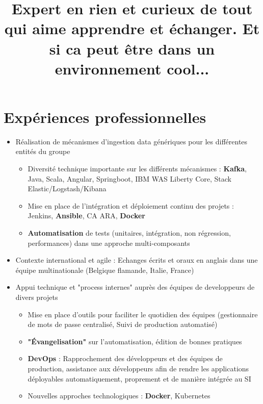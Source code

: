 \documentclass[10pt,a4paper]{moderncv}
\title{Expert en rien et curieux de tout qui aime apprendre et échanger.\newline
Et si ca peut être dans un environnement cool...}
\begin{document}
\makecvtitle

\section{Expériences professionnelles}

{
\begin{itemize}
 \item Réalisation de mécanismes d'ingestion data génériques pour les différentes entités du groupe
  \begin{itemize}
   \item Diversité technique importante sur les différents mécanismes : \textbf{Kafka}, Java, Scala, Angular, Springboot, IBM WAS Liberty Core, Stack Elastic/Logstash/Kibana
   \item Mise en place de l'intégration et déploiement continu des projets : Jenkins, \textbf{Ansible}, CA ARA, \textbf{Docker}
   \item \textbf{Automatisation} de tests (unitaires, intégration, non régression, performances) dans une approche multi-composants
  \end{itemize}
 \item Contexte international et agile : Echanges écrits et oraux en anglais dans une équipe multinationale (Belgique flamande, Italie, France) 
\end{itemize}
}

{
\begin{itemize}
 \item Appui technique et "process internes" auprès des équipes de developpeurs de divers projets
  \begin{itemize}
   \item Mise en place d'outils pour faciliter le quotidien des équipes (gestionnaire de mots de passe centralisé, Suivi de production automatisé) 
   \item \textbf{"\'{E}vangelisation"} sur l'automatisation, édition de bonnes pratiques 
   \item \textbf{DevOps} : Rapprochement des développeurs et des équipes de production, assistance aux développeurs afin de rendre les applications déployables automatiquement, proprement et de manière intégrée au SI
   \item Nouvelles approches technologiques : \textbf{Docker}, Kubernetes
  \end{itemize}
\end{itemize}
}
\end{document}
